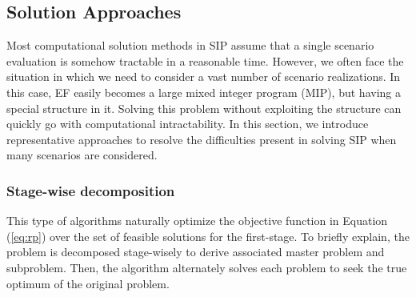 

\subsection{Solution Approaches}
Most computational solution methods in SIP assume that a single scenario evaluation is somehow tractable in a reasonable time. However, we often face the situation in which we need to consider a vast number of scenario realizations. In this case, EF easily becomes a large mixed integer program (MIP), but having a special structure in it. Solving this problem without exploiting the structure can quickly go with computational intractability. In this section, we introduce representative approaches to resolve the difficulties present in solving SIP when many scenarios are considered. 

\subsubsection{Stage-wise decomposition}
This type of algorithms naturally optimize the objective function in Equation (\ref{eq:rp}) over the set of feasible solutions for the first-stage. To briefly explain, the problem is decomposed stage-wisely to derive associated master problem and subproblem. Then, the algorithm alternately solves each problem to seek the true optimum of the original problem.
 
